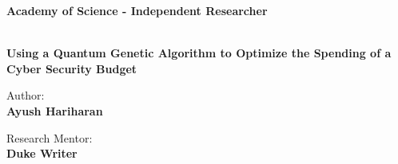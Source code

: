 \begin{titlepage}
    \begin{center}
        {\fontsize{19pt}{20pt}\selectfont \textbf{Academy of Science - Independent Researcher}}
    
        \hrulefill \\
        \vspace{0.8cm}
        \vspace{6cm}
        {\fontsize{22.5pt}{22.5}\textcolor{MyDarkBlue}{\textbf{Using a Quantum Genetic Algorithm to Optimize the Spending of a Cyber Security Budget}}}

    
        
        \vspace{11.5cm}
        \begin{minipage}[t]{0.34\textwidth}
        \begin{flushleft}
        {\fontsize{16pt}{16pt}Author: \\
        \vspace{1mm}
        \textbf{\textcolor{MyDarkBlue}{Ayush Hariharan}}}
        \end{flushleft}
        \end{minipage}
        \begin{minipage}[t]{0.64\textwidth}
        \begin{flushright} 
        {\fontsize{16pt}{16pt} Research Mentor: \\
        \vspace{1mm}
        \textbf{\textcolor{MyDarkBlue}{Duke Writer}}} 
        \end{flushright}
        \end{minipage}\\
    \end{center}
\end{titlepage}